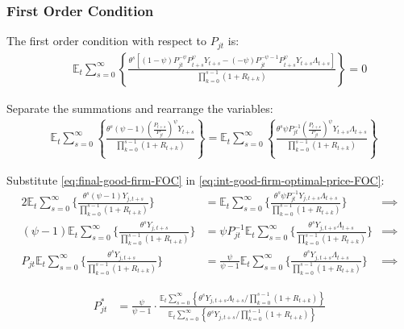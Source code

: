 \documentclass[
	12pt,
	]{article}
\numberwithin{equation}{section}
\newcommand{\E}[1][t]{{\mathbb{E}_{#1}}}
\theoremstyle{definition}
\theoremstyle{plain}
\theoremstyle{plain}
\theoremstyle{plain}
\begin{document}

\subsubsection*{First Order Condition}

The first order condition with respect to $P_{jt}$ is:
\begin{align}
	& \quad \E \sum_{s=0}^{\infty} \left\{ \frac{\theta^s \left[ (1-\psi) P_{jt}^{-\psi} P_{t+s}^{\psi} Y_{t+s} - (-\psi) P_{jt}^{-\psi-1} P_{t+s}^{\psi} Y_{t+s} \Lambda_{t+s} \right] }{\prod_{k=0}^{s-1}(1+R_{t+k})} \right\} = 0 \nonumber
\end{align}


Separate the summations and rearrange the variables:
\begin{align}
\label{eq:int-good-firm-optimal-price-FOC}
	& \E \sum_{s=0}^{\infty} \left\{ \frac{\theta^s (\psi-1) \left( \frac{P_{t+s}} {P_{jt}} \right)^{\psi} Y_{t+s}} {\prod_{k=0}^{s-1} (1+R_{t+k})} \right\} = \E \sum_{s=0}^{\infty} \left\{ \frac{\theta^s \psi P_{jt}^{-1} \left( \frac{P_{t+s}} {P_{jt}} \right)^{\psi} Y_{t+s} \Lambda_{t+s} }{\prod_{k=0}^{s-1}(1+R_{t+k})} \right\}
\end{align}


Substitute \ref{eq:final-good-firm-FOC} in \ref{eq:int-good-firm-optimal-price-FOC}:
\begin{alignat}{2}
	\E \sum_{s=0}^{\infty} \Bigg\{ \frac{\theta^s (\psi-1) Y_{j,t+s}}{\prod_{k=0}^{s-1}(1+R_{t+k})} \Bigg\} &= \E \sum_{s=0}^{\infty} \Bigg\{ \frac{\theta^s \psi P_{jt}^{-1} Y_{j,t+s} \Lambda_{t+s}}{\prod_{k=0}^{s-1}(1+R_{t+k})}  \Bigg\} &\implies \nonumber \\
	(\psi-1) \E \sum_{s=0}^{\infty} \Bigg\{ \frac{\theta^s Y_{j,t+s}}{\prod_{k=0}^{s-1}(1+R_{t+k})} \Bigg\} &= \psi P_{jt}^{-1} \E \sum_{s=0}^{\infty} \Bigg\{ \frac{\theta^s Y_{j,t+s} \Lambda_{t+s}}{\prod_{k=0}^{s-1}(1+R_{t+k})}  \Bigg\} &\implies \nonumber \\
	P_{jt} \E \sum_{s=0}^{\infty} \Bigg\{ \frac{\theta^s Y_{j,t+s}}{\prod_{k=0}^{s-1}(1+R_{t+k})} \Bigg\} &= \frac{\psi}{\psi-1} \E \sum_{s=0}^{\infty} \Bigg\{ \frac{\theta^s Y_{j,t+s} \Lambda_{t+s}}{\prod_{k=0}^{s-1}(1+R_{t+k})}  \Bigg\} &\implies \nonumber
\end{alignat}

\vspace*{-1cm}

\begin{align}
\label{eq:int-good-firm-optimal-price-FOC-2}
	P_{jt}^\ast &= 
	\frac{\psi}{\psi-1} \cdot
	\frac{
		\E \sum_{s=0}^{\infty} \left\{ 
		\theta^s Y_{j,t+s} \Lambda_{t+s} / \prod_{k=0}^{s-1}(1+R_{t+k}) \right\} } {\E \sum_{s=0}^{\infty} \left\{
	\theta^s Y_{j,t+s} / \prod_{k=0}^{s-1}(1+R_{t+k}) \right\}}
\end{align}
\end{document}
